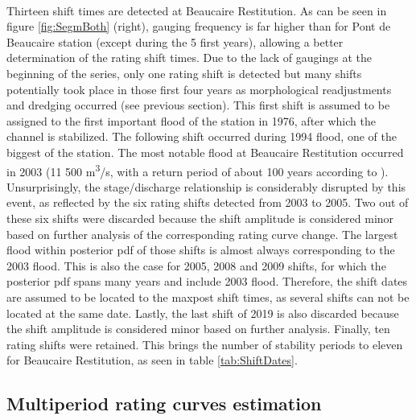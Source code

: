 \documentclass[11pt]{article}
\begin{document}
    \paragraph{}    
    Thirteen shift times are detected at Beaucaire Restitution. As can be seen in figure \ref{fig:SegmBoth} (right), gauging frequency is far higher than for Pont de Beaucaire station (except during the 5 first years), allowing a better determination of the rating shift times. 
    Due to the lack of gaugings at the beginning of the series, only one rating shift is detected but many shifts potentially took place in those first four years as morphological readjustments and dredging occurred (see previous section). This first shift is assumed to be assigned to the first important flood of the station in 1976, after which the channel is stabilized. The following shift occurred during 1994 flood, one of the biggest of the station. The most notable flood at Beaucaire Restitution occurred in 2003 (11 500 m\textsuperscript{3}/s, with a return period of about 100 years according to \citet{medd_debit_2005}). Unsurprisingly, the stage/discharge relationship is considerably disrupted by this event, as reflected by the six rating shifts detected from 2003 to 2005. Two out of these six shifts were discarded because the shift amplitude is considered minor based on further analysis of the corresponding rating curve change. The largest flood within posterior pdf of those shifts is almost always corresponding to the 2003 flood. This is also the case for 2005, 2008 and 2009 shifts, for which the posterior pdf spans many years and include 2003 flood. Therefore, the shift dates are assumed to be located to the maxpost shift times, as several shifts can not be located at the same date. Lastly, the last shift of 2019 is also discarded because the shift amplitude is considered minor based on further analysis. Finally, ten rating shifts were retained. This brings the number of stability periods to eleven for Beaucaire Restitution, as seen in table \ref{tab:ShiftDates}. 
        
    \subsection{Multiperiod rating curves estimation}
\end{document}
